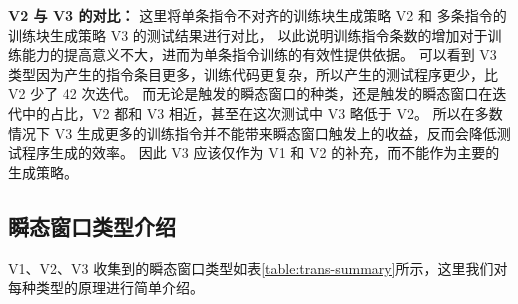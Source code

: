 \textbf{V2 与 V3 的对比：}
这里将单条指令不对齐的训练块生成策略 V2 和 多条指令的训练块生成策略 V3 的测试结果进行对比，
以此说明训练指令条数的增加对于训练能力的提高意义不大，进而为单条指令训练的有效性提供依据。
可以看到 V3 类型因为产生的指令条目更多，训练代码更复杂，所以产生的测试程序更少，比 V2 少了 42 次迭代。
而无论是触发的瞬态窗口的种类，还是触发的瞬态窗口在迭代中的占比，V2 都和 V3 相近，甚至在这次测试中 V3 略低于 V2。
所以在多数情况下 V3 生成更多的训练指令并不能带来瞬态窗口触发上的收益，反而会降低测试程序生成的效率。
因此 V3 应该仅作为 V1 和 V2 的补充，而不能作为主要的生成策略。\par

\subsection{瞬态窗口类型介绍}

V1、V2、V3 收集到的瞬态窗口类型如表\ref{table:trans-summary}所示，这里我们对每种类型的原理进行简单介绍。\par

